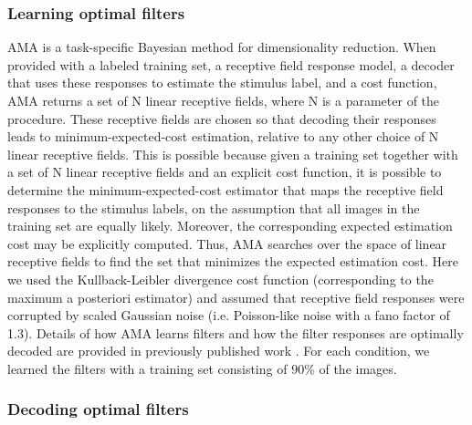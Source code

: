 \documentclass{jov}
\begin{document}
\subsubsection*{Learning optimal filters}
AMA is a task-specific Bayesian method for dimensionality reduction.
When provided with a labeled training set, a receptive field response model, a decoder that uses these responses to estimate the stimulus label, and a cost function, AMA returns a set of N linear receptive fields, where N is a parameter of the procedure.
These receptive fields are chosen so that decoding their responses leads to minimum-expected-cost estimation, relative to any other choice of N linear receptive fields.
This is possible because given a training set together with a set of N linear receptive fields and an explicit cost function, it is possible to determine the minimum-expected-cost estimator that maps the receptive field responses to the stimulus labels, on the assumption that all images in the training set are equally likely.
Moreover, the corresponding expected estimation cost may be explicitly computed.
Thus, AMA searches over the space of linear receptive fields to find the set that minimizes the expected estimation cost.
Here we used the Kullback-Leibler divergence cost function (corresponding to the maximum a posteriori estimator) and assumed that receptive field responses were corrupted by scaled Gaussian noise (i.e. Poisson-like noise with a fano factor of 1.3).
Details of how AMA learns filters and how the filter responses are optimally decoded are provided in previously published work \cite{geisler2009optimal,burge2017accuracy,jaini2017linking}.
For each condition, we learned the filters with a training set consisting of 90\% of the images.

\subsubsection*{Decoding optimal filters}
\end{document}
